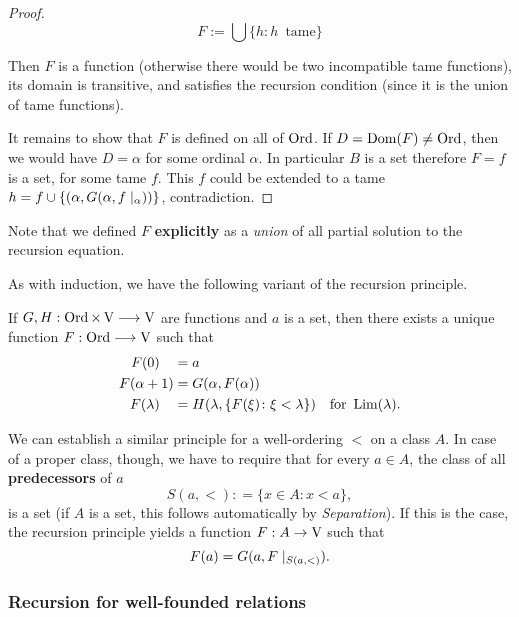 \begin{proof}
\begin{equation}
F := \bigcup \{h \colon h\, \text{ tame}\}
\end{equation}

Then $F$ is a function (otherwise there would be two incompatible tame functions), its domain is transitive, and satisfies the recursion condition (since it is the union of tame functions).

It remains to show that $F$ is defined on all of $\operatorname{Ord}$.
If $D = \operatorname{Dom}(F) \neq \operatorname{Ord}$, then we would have $D = \alpha$ for some ordinal $\alpha$. In particular $B$ is a set therefore $F = f$ is a set, for some tame $f$. This $f$ could be extended to a tame $h = f \cup \{(\alpha,G(\alpha,f \mid_{\alpha}))\}$, contradiction.

\end{proof}Note that we defined $F$ \textbf{explicitly} as a \textit{union} of all partial solution to the recursion equation.

As with induction, we have the following variant of the recursion principle.

\begin{proposition}\label{prop-ordinal-recursion-ii}If $G, H: \operatorname{Ord} \times \operatorname{V} \longrightarrow  \operatorname{V}$ are functions and $a$ is a set, then there exists a unique function $F: \operatorname{Ord} \longrightarrow \operatorname{V}$  such that
\begin{align*} 
    F(0) \quad & =  a\\ 
    F(\alpha+1) & =  G(\alpha,F(\alpha)) \\    
    F(\lambda) \quad & =  H(\lambda, \{F(\xi) \colon \xi<\lambda \}) \quad \text{for } \operatorname{Lim}(\lambda).
\end{align*}
\end{proposition}We can establish a similar principle for a well-ordering $<$ on a class $A$. In case of a proper class, though, we have to require that for every $a \in A$,  the class of all \textbf{predecessors} of $a$
\begin{equation*}
S(a,<): = \{x \in A\colon x < a \},
\end{equation*}
is a set (if $A$ is a set, this follows automatically by \textit{Separation}). If this is the case, the recursion principle yields a function $F: A \to \operatorname{V}$ such that
\begin{equation*}
F(a) = G(a,F\mid_{S(a,<)}).
\end{equation*}

\subsubsection{Recursion for well-founded relations}

